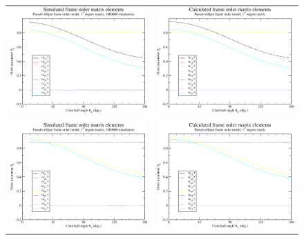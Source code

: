 \begin{figure}
\centering
  \begin{tabular}{@{}cc@{}}
    \includegraphics[width=.5\textwidth]{images/frame_order_matrix/Sij_pseudo-ellipse_in_frame_theta_x_ens1000000.eps} &
    \includegraphics[width=.5\textwidth]{images/frame_order_matrix/Sij_pseudo-ellipse_in_frame_theta_x_calc.eps} \\
    \\[-5pt]
    \includegraphics[width=.5\textwidth]{images/frame_order_matrix/Sij_pseudo-ellipse_in_frame_theta_y_ens1000000.eps} &
    \includegraphics[width=.5\textwidth]{images/frame_order_matrix/Sij_pseudo-ellipse_in_frame_theta_y_calc.eps} \\

\end{tabular}
\end{figure}
